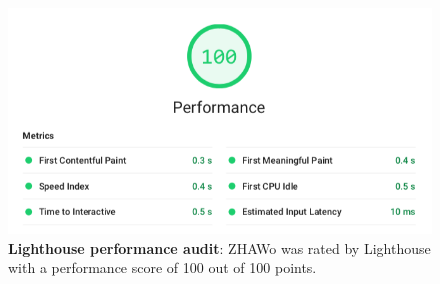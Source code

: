 \begin{markdown}
\bigskip

\begin{figure}[H]
  \includegraphics[width=13cm, center]{../../metrics/ZHAWoLighthousereportBAPreformance.png}
  \captionsetup{width=15.5cm}
  \caption [Lighthouse peformance audit]{\textbf{Lighthouse performance audit}: ZHAWo was rated by Lighthouse with a performance score of 100 out of 100 points.}
  \label{fig:LighthousePreformance}
\end{figure}

\newpage

\end{markdown}


